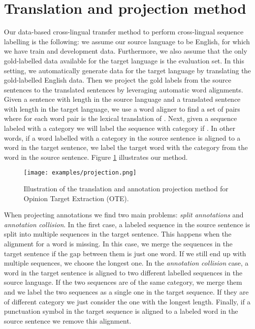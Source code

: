 \documentclass[11pt]{article}
\begin{document}
\section{Translation and projection method}
\label{sec:Method}

Our data-based cross-lingual transfer method to perform cross-lingual sequence labelling is the following: we assume our source language to be English, for which we have train and development data. Furthermore, we also assume that the only gold-labelled data available for the target language is the evaluation set. In this setting, we automatically generate data for the target language by translating the gold-labelled English data. Then we project the gold labels from the source sentences to the translated sentences by leveraging automatic word alignments. Given a sentence    with length  in the source language and a translated sentence     with length  in the target language,  we use a word aligner to find a set of pairs  where for each word pair   is the lexical translation of . Next, given a sequence   labeled with a category  we will label the sequence  with category  if . In other words, if a word labelled with a category in the source sentence is aligned to a word in the target sentence, we label the target word with the category from the word in the source sentence. Figure \ref{fig:DataExample} illustrates our method. 

\begin{figure}[t]
    \centering
    \texttt{[image: examples/projection.png]}
    \caption{Illustration of the translation and annotation projection method for Opinion Target Extraction (OTE).}
    \label{fig:DataExample}
\end{figure}

When projecting annotations we find two main problems: {\it split annotations} and {\it annotation collision}. In the first case, a labeled sequence in the source sentence is split into multiple sequences in the target sentence. This happens when the alignment for a word is missing. In this case, we merge the sequences in the target sentence if the gap between them is just one word. If we still end up with multiple sequences, we choose the longest one. In the {\it annotation collision} case, a word in the target sentence is aligned to two different labelled sequences in the source language. If the two sequences are of the same category, we merge them and we label the two sequences as a single one in the target sequence. If they are of different category we just consider the one with the longest length. Finally, if a punctuation symbol in the target sequence is aligned to a labeled word in the source sentence we remove this alignment.
\end{document}
